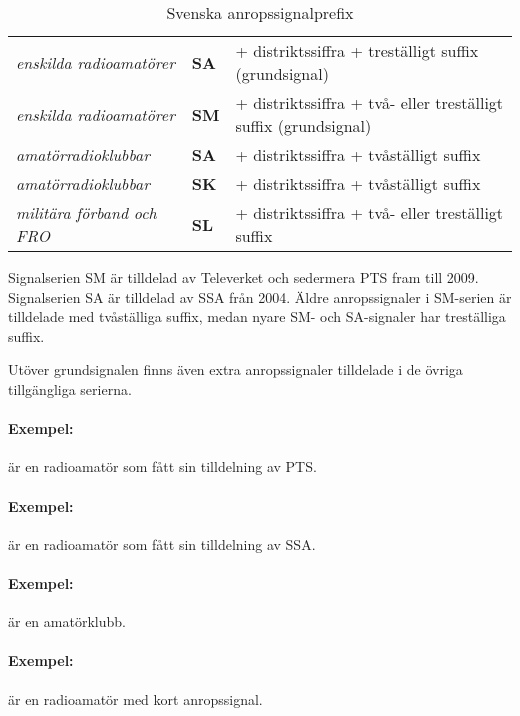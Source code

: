 \begin{table*}[ht]
  \begin{center}
    \begin{tabular}{lll}
      \emph{enskilda radioamatörer} & \textbf{SA} &
      + distriktssiffra + treställigt suffix (grundsignal) \\
      \emph{enskilda radioamatörer} & \textbf{SM} &
      + distriktssiffra + två- eller treställigt suffix (grundsignal) \\
      \emph{amatörradioklubbar} & \textbf{SA} &
      + distriktssiffra + tvåställigt suffix \\
      \emph{amatörradioklubbar} & \textbf{SK} &
      + distriktssiffra + tvåställigt suffix \\
      \emph{militära förband och FRO} & \textbf{SL} &
      + distriktssiffra + två- eller treställigt suffix \\
    \end{tabular}
    \caption{Svenska anropssignalprefix}
    \label{tab:seprefix}
  \end{center}
\end{table*}

Signalserien SM är tilldelad av Televerket och sedermera PTS fram till 2009.
Signalserien SA är tilldelad av SSA från 2004.
Äldre anropssignaler i SM-serien är tilldelade med tvåställiga suffix, medan
nyare SM- och SA-signaler har treställiga suffix.

Utöver grundsignalen finns även extra anropssignaler tilldelade i de övriga
tillgängliga serierna.
\paragraph{Exempel:}  är en radioamatör som fått sin tilldelning av PTS.
\paragraph{Exempel:}  är en radioamatör som fått sin tilldelning av SSA.
\paragraph{Exempel:}  är en amatörklubb.
\paragraph{Exempel:}  är en radioamatör med kort anropssignal.

\medskip


